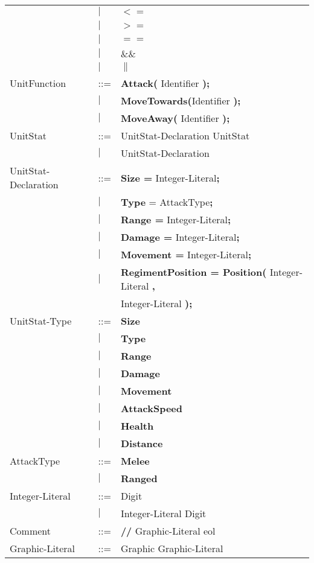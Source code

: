 \begin{center}
\begin{longtable}{l l l}
									&$\mid$	&$\boldsymbol {<=}$\\
									&$\mid$	&$\boldsymbol {>=}$\\
									&$\mid$	&$\boldsymbol {==}$\\
									&$\mid$	&$\boldsymbol {\&\&}$\\
									&$\mid$	&$\boldsymbol {\|}$\\
		UnitFunction				&	::=	&{\bf Attack(} Identifier {\bf );} \\
									&$\mid$	&{\bf MoveTowards(}Identifier {\bf );} \\
									&$\mid$	&{\bf MoveAway(} Identifier {\bf );} \\
		UnitStat					&	::=	&UnitStat-Declaration UnitStat \\
									&$\mid$	&UnitStat-Declaration \\
		UnitStat-Declaration		&	::=	&{\bf Size =} Integer-Literal{\bf ;} \\
									&$\mid$	&{\bf Type} = AttackType{\bf ;}\\
									&$\mid$	&{\bf  Range =} Integer-Literal{\bf;}\\
									&$\mid$	&{\bf Damage =} Integer-Literal{\bf ;}\\
									&$\mid$	&{\bf Movement = }Integer-Literal{\bf ;} \\				  
									&$\mid$	& {\bf RegimentPosition = Position(} Integer-Literal {\bf ,}\\
									&		& Integer-Literal {\bf );}\\
		UnitStat-Type				&	::=	&{\bf Size}\\
									&$\mid$	&{\bf Type}\\
									&$\mid$	&{\bf Range}\\
									&$\mid$	&{\bf Damage}\\
									&$\mid$	&{\bf Movement}\\
									&$\mid$	&{\bf AttackSpeed}\\
									&$\mid$	&{\bf Health}\\
									&$\mid$	&{\bf Distance}\\
		AttackType					&	::=	&{\bf Melee}\\
									&$\mid$	&{\bf Ranged}\\
		Integer-Literal				&	::=	&Digit\\
									&$\mid$	&Integer-Literal Digit\\
		Comment						&	::=	&{\bf //} Graphic-Literal eol\\
		Graphic-Literal				&	::=	&Graphic Graphic-Literal\\

\end{longtable}
\end{center}
